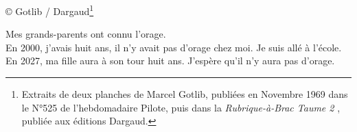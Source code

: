 \vspace*{-3.5mm}
© Gotlib / Dargaud\footnote{Extraits de deux planches de Marcel Gotlib, publiées en Novembre 1969 dans le N°525 de l'hebdomadaire Pilote, puis dans la \textit{Rubrique-à-Brac Taume 2} \cite{gotlib_rubriqueabrac_1971}, publiée aux éditions Dargaud.}

\vspace*{-3mm}
\begin{flushright}
\noindent
Mes grands-parents ont connu l'orage.\\
En 2000, j'avais huit ans, il n'y avait pas d'orage chez moi. Je suis allé à l'école.\\
En 2027, ma fille aura à son tour huit ans. J'espère qu'il n'y aura pas d'orage.\\
\end{flushright}
\vspace*{-1cm}

